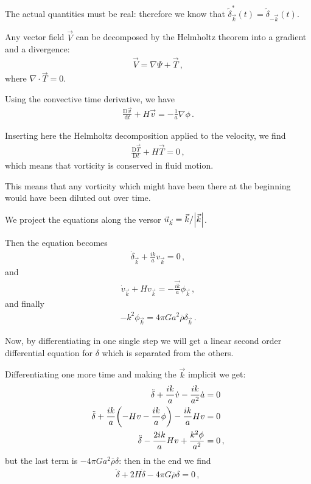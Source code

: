 \documentclass[main.tex]{subfiles}
\begin{document}
The actual quantities must be real: therefore we know that \(\widetilde{\delta}^{*}_{\vec{k}} (t) = \widetilde{\delta}_{-\vec{k}} (t)\).

Any vector field \(\vec{V}\) can be decomposed by the Helmholtz theorem into a gradient and a divergence: 
%
\begin{align}
  \vec{V} = \nabla \Psi + \vec{T}
\,,
\end{align}
%
where \(\nabla \cdot \vec{T} = 0\).

Using the convective time derivative, we have 
%
\begin{align}
  \frac{\mathrm{D} \vec{v}}{\mathrm{d}t} 
  + H \vec{v} = - \frac{1}{a} \nabla \phi 
\,.
\end{align}

Inserting here the Helmholtz decomposition applied to the velocity, we find 
%
\begin{align}
  \frac{\mathrm{D} \vec{T}}{\mathrm{D}t} + H \vec{T} = 0
\,,
\end{align}
%
which means that vorticity is conserved in fluid motion. 

This means that any vorticity which might have been there at the beginning would have been diluted out over time.

We project the equations along the versor \(\vec{u}_{\vec{k}} = \vec{k} / \abs{\vec{k}}\). 

Then the equation becomes 
%
\begin{align}
  \dot{\delta}_{\vec{k}} + \frac{ik}{a} v_{\vec{k}} =0
\,,
\end{align}
%
and 
%
\begin{align}
  \dot{v}_{\vec{k}} + H v_{\vec{k}} = - \frac{\vec{ik}}{a} \phi_{\vec{k}}
  \,,
\end{align}
%
and finally 
%
\begin{align}
  - k^2 \phi_{\vec{k}} = 4 \pi G a^2 \overline{\rho} \delta_{\vec{k}}
\,.
\end{align}

Now, by differentiating in one single step we will get a linear second order differential equation for \(\delta \) which is separated from the others. 

Differentiating one more time and making the \(\vec{k}\) implicit we get: 
%
\begin{subequations}
\begin{align}
  \ddot{\delta} + \frac{ik}{a} \dot{v} - \frac{ik}{a^2}\dot{a} &= 0  \\
  \ddot{\delta} + \frac{ik}{a} \qty(-Hv - \frac{ik}{a} \phi ) - \frac{ik}{a} Hv &=0  \\
  \ddot{\delta} - \frac{2ik}{a} Hv + \frac{k^2 \phi }{a^2} &=0
\,,
\end{align}
\end{subequations}
%
but the last term is \(- 4 \pi G a^2 \overline{\rho} \delta \): then in the end we find 
%
\begin{align}
  \ddot{\delta} + 2 H \dot{\delta} - 4 \pi G \overline{\rho} \delta = 0 
\,,
\end{align}
%
\end{document}
